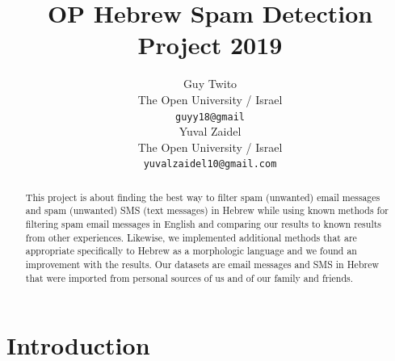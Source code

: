 \documentclass[11pt,a4paper]{article}
\title{OP Hebrew Spam Detection Project 2019}
\author{Guy Twito \\
  The Open University / Israel \\
  \texttt{guyy18@gmail} \\\And
  Yuval Zaidel \\
  The Open University / Israel \\
  \texttt{yuvalzaidel10@gmail.com} \\}
\date{}
\begin{document}
\maketitle
\begin{abstract}
This project is about finding the best way to filter spam (unwanted) email messages and spam (unwanted) SMS (text messages) in Hebrew while using known methods for filtering spam email messages in English and comparing our results to known results from other experiences.
Likewise, we implemented additional methods that are appropriate specifically to Hebrew as a morphologic language and we found an improvement with the results.
Our datasets are email messages and SMS in Hebrew that were imported from personal sources of us and of our family and friends.

\end{abstract}



\section{Introduction}
\end{document}
